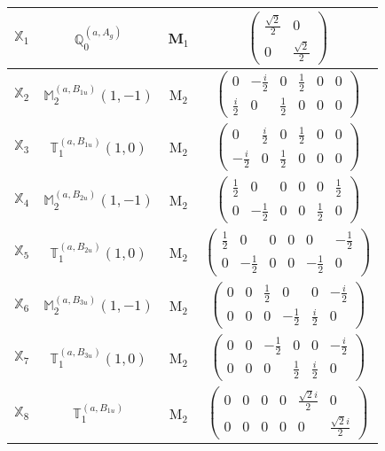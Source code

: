 \documentclass[fleqn,10pt,landscape]{article}
\begin{document}
\begin{itemize}
\begin{center}
\begin{longtable}{c|c|c|c}
$ \mathbb{X}_{1} $ & $\mathbb{Q}_{0}^{(a,A_{g})}$ & M$_{1}$ & $\begin{pmatrix} \frac{\sqrt{2}}{2} & 0 \\ 0 & \frac{\sqrt{2}}{2} \end{pmatrix}$ \\ \hline
$ \mathbb{X}_{2} $ & $\mathbb{M}_{2}^{(a,B_{1u})}(1,-1)$ & M$_{2}$ & $\begin{pmatrix} 0 & - \frac{i}{2} & 0 & \frac{1}{2} & 0 & 0 \\ \frac{i}{2} & 0 & \frac{1}{2} & 0 & 0 & 0 \end{pmatrix}$ \\
$ \mathbb{X}_{3} $ & $\mathbb{T}_{1}^{(a,B_{1u})}(1,0)$ & M$_{2}$ & $\begin{pmatrix} 0 & \frac{i}{2} & 0 & \frac{1}{2} & 0 & 0 \\ - \frac{i}{2} & 0 & \frac{1}{2} & 0 & 0 & 0 \end{pmatrix}$ \\
$ \mathbb{X}_{4} $ & $\mathbb{M}_{2}^{(a,B_{2u})}(1,-1)$ & M$_{2}$ & $\begin{pmatrix} \frac{1}{2} & 0 & 0 & 0 & 0 & \frac{1}{2} \\ 0 & - \frac{1}{2} & 0 & 0 & \frac{1}{2} & 0 \end{pmatrix}$ \\
$ \mathbb{X}_{5} $ & $\mathbb{T}_{1}^{(a,B_{2u})}(1,0)$ & M$_{2}$ & $\begin{pmatrix} \frac{1}{2} & 0 & 0 & 0 & 0 & - \frac{1}{2} \\ 0 & - \frac{1}{2} & 0 & 0 & - \frac{1}{2} & 0 \end{pmatrix}$ \\
$ \mathbb{X}_{6} $ & $\mathbb{M}_{2}^{(a,B_{3u})}(1,-1)$ & M$_{2}$ & $\begin{pmatrix} 0 & 0 & \frac{1}{2} & 0 & 0 & - \frac{i}{2} \\ 0 & 0 & 0 & - \frac{1}{2} & \frac{i}{2} & 0 \end{pmatrix}$ \\
$ \mathbb{X}_{7} $ & $\mathbb{T}_{1}^{(a,B_{3u})}(1,0)$ & M$_{2}$ & $\begin{pmatrix} 0 & 0 & - \frac{1}{2} & 0 & 0 & - \frac{i}{2} \\ 0 & 0 & 0 & \frac{1}{2} & \frac{i}{2} & 0 \end{pmatrix}$ \\
$ \mathbb{X}_{8} $ & $\mathbb{T}_{1}^{(a,B_{1u})}$ & M$_{2}$ & $\begin{pmatrix} 0 & 0 & 0 & 0 & \frac{\sqrt{2} i}{2} & 0 \\ 0 & 0 & 0 & 0 & 0 & \frac{\sqrt{2} i}{2} \end{pmatrix}$ \\

\end{longtable}
\end{center}
\end{itemize}
\end{document}
